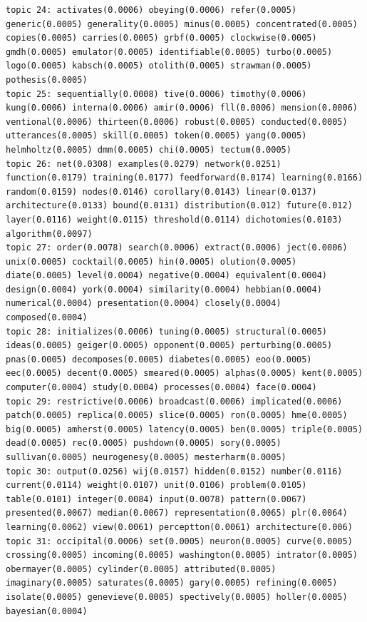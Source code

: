 \documentclass[10pt]{article}
\begin{document}
\begin{verbatim}
topic 24: activates(0.0006) obeying(0.0006) refer(0.0005) generic(0.0005) generality(0.0005) minus(0.0005) concentrated(0.0005) copies(0.0005) carries(0.0005) grbf(0.0005) clockwise(0.0005) gmdh(0.0005) emulator(0.0005) identifiable(0.0005) turbo(0.0005) logo(0.0005) kabsch(0.0005) otolith(0.0005) strawman(0.0005) pothesis(0.0005)
topic 25: sequentially(0.0008) tive(0.0006) timothy(0.0006) kung(0.0006) interna(0.0006) amir(0.0006) fll(0.0006) mension(0.0006) ventional(0.0006) thirteen(0.0006) robust(0.0005) conducted(0.0005) utterances(0.0005) skill(0.0005) token(0.0005) yang(0.0005) helmholtz(0.0005) dmm(0.0005) chi(0.0005) tectum(0.0005)
topic 26: net(0.0308) examples(0.0279) network(0.0251) function(0.0179) training(0.0177) feedforward(0.0174) learning(0.0166) random(0.0159) nodes(0.0146) corollary(0.0143) linear(0.0137) architecture(0.0133) bound(0.0131) distribution(0.012) future(0.012) layer(0.0116) weight(0.0115) threshold(0.0114) dichotomies(0.0103) algorithm(0.0097)
topic 27: order(0.0078) search(0.0006) extract(0.0006) ject(0.0006) unix(0.0005) cocktail(0.0005) hin(0.0005) olution(0.0005) diate(0.0005) level(0.0004) negative(0.0004) equivalent(0.0004) design(0.0004) york(0.0004) similarity(0.0004) hebbian(0.0004) numerical(0.0004) presentation(0.0004) closely(0.0004) composed(0.0004)
topic 28: initializes(0.0006) tuning(0.0005) structural(0.0005) ideas(0.0005) geiger(0.0005) opponent(0.0005) perturbing(0.0005) pnas(0.0005) decomposes(0.0005) diabetes(0.0005) eoo(0.0005) eec(0.0005) decent(0.0005) smeared(0.0005) alphas(0.0005) kent(0.0005) computer(0.0004) study(0.0004) processes(0.0004) face(0.0004)
topic 29: restrictive(0.0006) broadcast(0.0006) implicated(0.0006) patch(0.0005) replica(0.0005) slice(0.0005) ron(0.0005) hme(0.0005) big(0.0005) amherst(0.0005) latency(0.0005) ben(0.0005) triple(0.0005) dead(0.0005) rec(0.0005) pushdown(0.0005) sory(0.0005) sullivan(0.0005) neurogenesy(0.0005) mesterharm(0.0005)
topic 30: output(0.0256) wij(0.0157) hidden(0.0152) number(0.0116) current(0.0114) weight(0.0107) unit(0.0106) problem(0.0105) table(0.0101) integer(0.0084) input(0.0078) pattern(0.0067) presented(0.0067) median(0.0067) representation(0.0065) plr(0.0064) learning(0.0062) view(0.0061) perceptton(0.0061) architecture(0.006)
topic 31: occipital(0.0006) set(0.0005) neuron(0.0005) curve(0.0005) crossing(0.0005) incoming(0.0005) washington(0.0005) intrator(0.0005) obermayer(0.0005) cylinder(0.0005) attributed(0.0005) imaginary(0.0005) saturates(0.0005) gary(0.0005) refining(0.0005) isolate(0.0005) genevieve(0.0005) spectively(0.0005) holler(0.0005) bayesian(0.0004)

\end{verbatim}
\end{document}
